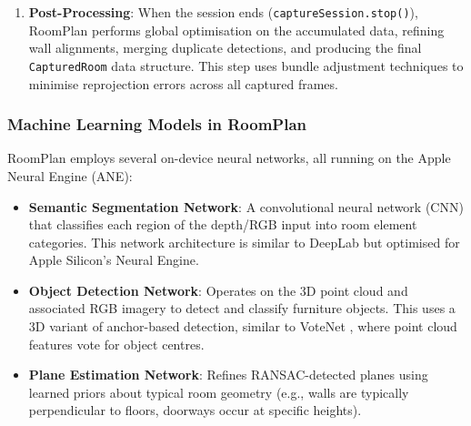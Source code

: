 \begin{enumerate}
    Each detected object provides:
    \begin{itemize}
        \item A \textbf{transform} (\texttt{simd\_float4x4}): A 4$\times$4 homogeneous transformation matrix encoding the object's position, orientation, and scale in world coordinates.
        \item \textbf{Dimensions} (\texttt{SIMD3<Float>}): The axis-aligned bounding box extents (width, height, depth) in metres.
        \item A \textbf{category} label from the above classification.
    \end{itemize}

    \item \textbf{Post-Processing}: When the session ends (\texttt{captureSession.stop()}), RoomPlan performs global optimisation on the accumulated data, refining wall alignments, merging duplicate detections, and producing the final \texttt{CapturedRoom} data structure. This step uses bundle adjustment techniques to minimise reprojection errors across all captured frames.
\end{enumerate}

\subsubsection{Machine Learning Models in RoomPlan}

RoomPlan employs several on-device neural networks, all running on the Apple Neural Engine (ANE):

\begin{itemize}
    \item \textbf{Semantic Segmentation Network}: A convolutional neural network (CNN) that classifies each region of the depth/RGB input into room element categories. This network architecture is similar to DeepLab \cite{chen2017deeplab} but optimised for Apple Silicon's Neural Engine.
    \item \textbf{Object Detection Network}: Operates on the 3D point cloud and associated RGB imagery to detect and classify furniture objects. This uses a 3D variant of anchor-based detection, similar to VoteNet \cite{qi2019votenet}, where point cloud features vote for object centres.
    \item \textbf{Plane Estimation Network}: Refines RANSAC-detected planes using learned priors about typical room geometry (e.g., walls are typically perpendicular to floors, doorways occur at specific heights).
\end{itemize}

